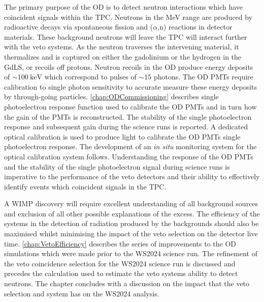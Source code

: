 The primary purpose of the OD is to detect neutron interactions which have coincident signals within the TPC. Neutrons in the MeV range are produced by radioactive decays via spontaneous fission and ($\alpha$,n) reactions in detector materials. These background neutrons will leave the TPC will interact further with the veto systems. As the neutron traverses the intervening material, it thermalizes and is captured on either the gadolinium or the hydrogen in the GdLS, or recoils off protons. Neutron recoils in the OD produce energy deposits of $\sim100~\text{keV}$ which correspond to pulses of $\sim15$ photons. The OD PMTs require calibration to single photon sensitivity to accurate measure these energy deposits by through-going particles. \autoref{chap:ODCommissioning} describes single photoelectron response function used to calibrate the OD PMTs and in turn how the gain of the PMTs is reconstructed. The stability of the single photoelectron response and subsequent gain during the science runs is reported. A dedicated optical calibration is used to produce light to calibrate the OD PMTs single photoelectron response. The development of an \textit{in situ} monitoring system for the optical calibration system follows. Understanding the response of the OD PMTs and the stability of the single photoelectron signal during science runs is imperative to the performance of the veto detectors and their ability to effectively identify events which coincident signals in the TPC.

A WIMP discovery will require excellent understanding of all background sources and exclusion of all other possible explanations of the excess. The efficiency of the systems in the detection of radiation produced by the backgrounds should also be maximised whilst minimising the impact of the veto selection on the detector live time. \autoref{chap:VetoEfficiency} describes the series of improvements to the OD simulations which were made prior to the WS2024 science run. The refinement of the veto coincidence selection for the WS2024 science run is discussed and precedes the calculation used to estimate the veto systems ability to detect neutrons. The chapter concludes with a discussion on the impact that the veto selection and system has on the WS2024 analysis. 

